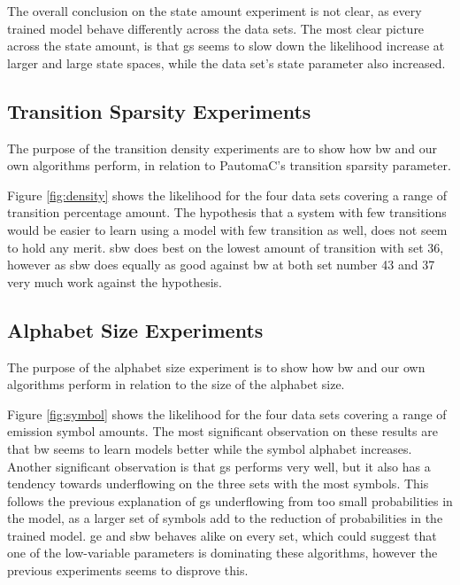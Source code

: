 The overall conclusion on the state amount experiment is not clear, as every trained model behave differently across the data sets. The most clear picture across the state amount, is that \gls{gs} seems to slow down the likelihood increase at larger and large state spaces, while the data set's state parameter also increased.\\
	
\FloatBarrier

\subsection{Transition Sparsity Experiments}

The purpose of the transition density experiments are to show how \gls{bw} and our own algorithms perform, in relation to PautomaC's transition sparsity parameter.

Figure \ref{fig:density} shows the likelihood for the four data sets covering a range of transition percentage amount. The hypothesis that a system with few transitions would be easier to learn using a model with few transition as well, does not seem to hold any merit. \gls{sbw} does best on the lowest amount of transition with set 36, however as \gls{sbw} does equally as good against \gls{bw} at both set number 43 and 37 very much work against the hypothesis.\\ 
	
	\FloatBarrier

\subsection{Alphabet Size Experiments}
The purpose of the alphabet size experiment is to show how \gls{bw} and our own algorithms perform in relation to the size of the alphabet size.

Figure \ref{fig:symbol} shows the likelihood for the four data sets covering a range of emission symbol amounts. The most significant observation on these results are that \gls{bw} seems to learn models better while the symbol alphabet increases. Another significant observation is that \gls{gs} performs very well, but it also has a tendency towards underflowing on the three sets with the most symbols. This follows the previous explanation of \gls{gs} underflowing from too small probabilities in the model, as a larger set of symbols add to the reduction of probabilities in the trained model.
\gls{ge} and \gls{sbw} behaves alike on every set, which could suggest that one of the low-variable parameters is dominating these algorithms, however the previous experiments seems to disprove this. \\
	
\FloatBarrier
	
